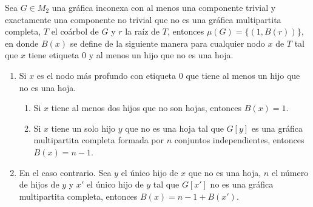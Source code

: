 \begin{lemma}\label{lema_parejas_03}
Sea $G\in M_2$ una gráfica inconexa con al menos una componente trivial y exactamente una componente no trivial que no es una gráfica multipartita completa, $T$ el coárbol de $G$ y $r$ la raíz de $T$, entonces $\mu(G)=\{(1,B(r))\}$, en donde $B(x)$ se define de la siguiente manera para cualquier nodo $x$ de $T$ tal que $x$ tiene etiqueta 0 y al menos un hijo que no es una hoja.
\begin{enumerate}
    \item Si $x$ es el nodo más profundo con etiqueta 0 que tiene al menos un hijo que no es una hoja.
    \begin{enumerate}
        \item Si $x$ tiene al menos dos hijos que no son hojas, entonces $B(x) = 1$.
        \item Si $x$ tiene un solo hijo $y$ que no es una hoja tal que $G[y]$ es una gráfica multipartita completa formada por $n$ conjuntos independientes, entonces $B(x) = n-1$. 
    \end{enumerate}
    \item En el caso contrario. Sea $y$ el único hijo de $x$ que no es una hoja, $n$ el número de hijos de $y$ y $x'$ el único hijo de $y$ tal que $G[x']$ no es una gráfica multipartita completa, entonces $B(x) = n-1 + B(x')$.
\end{enumerate}
\end{lemma}

